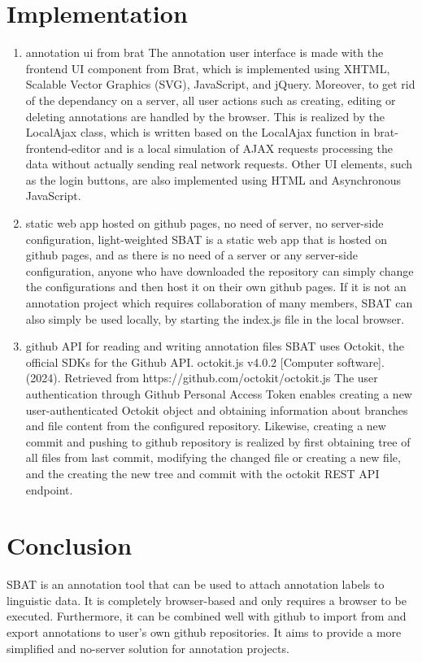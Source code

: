 \documentclass[a4paper]{article}
\begin{document}
\section{Implementation}
\begin{enumerate}
\item annotation ui from brat
The annotation user interface is made with the frontend UI component from Brat, which is implemented using XHTML, Scalable Vector Graphics (SVG), JavaScript, and jQuery. Moreover, to get rid of the dependancy on a server, all user actions such as creating, editing or deleting annotations are handled by the browser. This is realized by the LocalAjax class, which is written based on the LocalAjax function in brat-frontend-editor and is a local simulation of AJAX requests processing the data without actually sending real network requests. Other UI elements, such as the login buttons, are also implemented using HTML and Asynchronous JavaScript.
\item static web app hosted on github pages, no need of server, no server-side configuration, light-weighted
SBAT is a static web app that is hosted on github pages, and as there is no need of a server or any server-side configuration, anyone who have downloaded the repository can simply change the configurations and then host it on their own github pages. If it is not an annotation project which requires collaboration of many members, SBAT can also simply be used locally, by starting the index.js file in the local browser.
\item github API for reading and writing annotation files
SBAT uses Octokit, the official SDKs for the Github API.
octokit.js v4.0.2 [Computer software]. (2024). Retrieved from https://github.com/octokit/octokit.js
The user authentication through Github Personal Access Token enables creating a new user-authenticated Octokit object and obtaining information about branches and file content from the configured repository.  Likewise, creating a new commit and pushing to github repository is realized by first obtaining tree of all files from last commit, modifying the changed file or creating a new file, and the creating the new tree and commit with the octokit REST API endpoint.
\end{enumerate}

\section{Conclusion}
SBAT is an annotation tool that can be used to attach annotation labels to linguistic data. It is completely browser-based and only requires a browser to be executed. Furthermore, it can be combined well with github to import from and export annotations to user's own github repositories. It aims to provide a more simplified and no-server solution for annotation projects.\\ 
\end{document}
